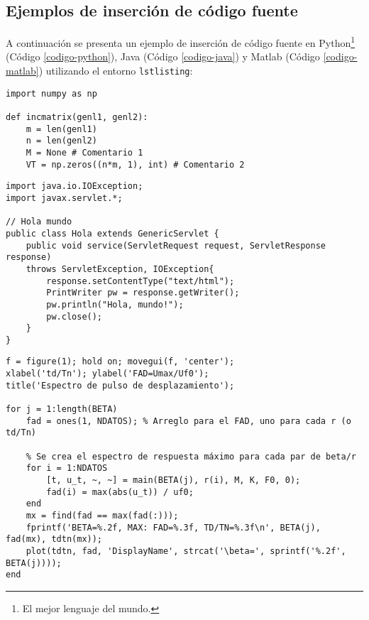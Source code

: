 		\lipsum[4]
		
		\begin{multicols}{2}
			
			\lipsum[4]
			
			
			\lipsum[1]
			
		\end{multicols}
		
	\subsection{Ejemplos de inserción de código fuente}
		
		A continuación se presenta un ejemplo de inserción de código fuente en Python\footnote{El mejor lenguaje del mundo.} (Código \ref{codigo-python}), Java (Código \ref{codigo-java}) y Matlab (Código \ref{codigo-matlab}) utilizando el entorno \texttt{lstlisting}:
		
\begin{lstlisting}[style=Python, caption={Ejemplo en Python.\label{codigo-python}}]
import numpy as np

def incmatrix(genl1, genl2):
	m = len(genl1)
	n = len(genl2)
	M = None # Comentario 1
	VT = np.zeros((n*m, 1), int) # Comentario 2
\end{lstlisting}

\begin{lstlisting}[style=Java, caption={Ejemplo en Java.\label{codigo-java}}]
import java.io.IOException; 
import javax.servlet.*;

// Hola mundo
public class Hola extends GenericServlet {
	public void service(ServletRequest request, ServletResponse response)
	throws ServletException, IOException{
		response.setContentType("text/html");
		PrintWriter pw = response.getWriter();
		pw.println("Hola, mundo!");
		pw.close();
	}
}
\end{lstlisting}

\begin{lstlisting}[style=Matlab, caption={Ejemplo en Matlab.\label{codigo-matlab}}]
% Se crea gráfico
f = figure(1); hold on; movegui(f, 'center');
xlabel('td/Tn'); ylabel('FAD=Umax/Uf0');
title('Espectro de pulso de desplazamiento');

for j = 1:length(BETA)
	fad = ones(1, NDATOS); % Arreglo para el FAD, uno para cada r (o td/Tn)
	
	% Se crea el espectro de respuesta máximo para cada par de beta/r
	for i = 1:NDATOS
		[t, u_t, ~, ~] = main(BETA(j), r(i), M, K, F0, 0);
		fad(i) = max(abs(u_t)) / uf0;
	end
	mx = find(fad == max(fad(:)));
	fprintf('BETA=%.2f, MAX: FAD=%.3f, TD/TN=%.3f\n', BETA(j), fad(mx), tdtn(mx));
	plot(tdtn, fad, 'DisplayName', strcat('\beta=', sprintf('%.2f', BETA(j))));
end
\end{lstlisting}


